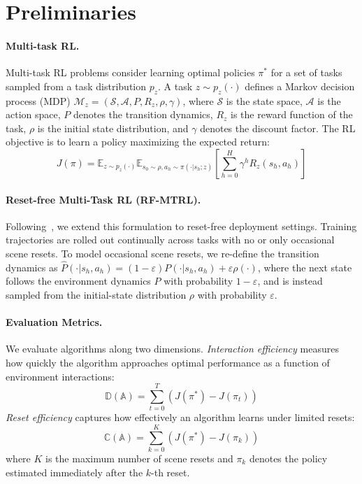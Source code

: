 \section{Preliminaries}

\paragraph{Multi-task RL.}
Multi-task RL problems consider learning optimal policies $\pi^*$ for a set of tasks sampled from a task distribution $p_z$. A task $z \sim p_z(\cdot)$ defines a Markov decision process (MDP) $\mathcal{M}_z = (\mathcal{S}, \mathcal{A}, P, R_z, \rho, \gamma)$, where $\mathcal{S}$ is the state space, $\mathcal{A}$ is the action space, $P$ denotes the transition dynamics, $R_z$ is the reward function of the task, $\rho$ is the initial state distribution, and $\gamma$ denotes the discount factor. The RL objective is to learn a policy maximizing the expected return:
\begin{equation}
    J(\pi) = \mathbb{E}_{z \sim p_z(\cdot)}\mathbb{E}_{s_0 \sim \rho, a_h \sim \pi(\cdot|s_h;z)}
    \left[\sum_{h=0}^{H} \gamma^h R_z(s_h, a_h)\right]
\end{equation}

\paragraph{Reset-free Multi-Task RL (RF-MTRL).}
Following~\cite{sharma2021earl}, we extend this formulation to reset-free deployment settings. Training trajectories are rolled out continually across tasks with no or only occasional scene resets. To model occasional scene resets, we re-define the transition dynamics as $\hat{P}(\cdot|s_h, a_h) = (1 - \varepsilon)P(\cdot|s_h, a_h) + \varepsilon\rho(\cdot)$, where the next state follows the environment dynamics $P$ with probability $1-\varepsilon$, and is instead sampled from the initial-state distribution $\rho$ with probability $\varepsilon$.

\paragraph{Evaluation Metrics.}
We evaluate algorithms along two dimensions. \emph{Interaction efficiency} measures how quickly the algorithm approaches optimal performance as a function of environment interactions:
\begin{equation}
    \mathbb{D}(\mathbb{A}) = \sum_{t=0}^{T} \left(J(\pi^*) - J(\pi_t)\right)
\end{equation}
\emph{Reset efficiency} captures how effectively an algorithm learns under limited resets:
\begin{equation}
    \mathbb{C}(\mathbb{A}) = \sum_{k=0}^{K} \left(J(\pi^*) - J(\pi_k)\right)
\end{equation}
where $K$ is the maximum number of scene resets and $\pi_k$ denotes the policy estimated immediately after the $k$-th reset.

